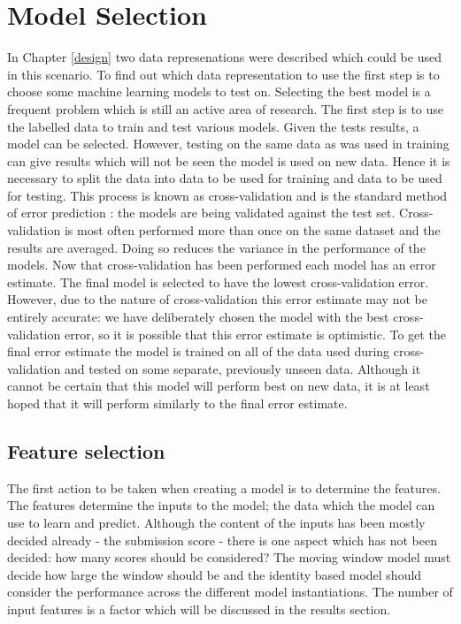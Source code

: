 \chapter{Model Selection}
\label{machinelearning}
In Chapter \ref{design} two data represenations were described which could be used in this scenario. To find out which data representation to use the first step is to choose some machine learning models to test on. Selecting the best model is a frequent problem which is still an active area of research. The first step is to use the labelled data to train and test various models. Given the tests results, a model can be selected. However, testing on the same data as was used in training can give results which will not be seen the model is used on new data. Hence it is necessary to split the data into data to be used for training and data to be used for testing. This process is known as cross-validation and is the standard method of error prediction \cite{witten2011data}: the models are being validated against the test set. Cross-validation is most often performed more than once on the same dataset and the results are averaged. Doing so reduces the variance in the performance of the models.
Now that cross-validation has been performed each model has an error estimate. The final model is selected to have the lowest cross-validation error. However, due to the nature of cross-validation this error estimate may not be entirely accurate: we have deliberately chosen the model with the best cross-validation error, so it is possible that this error estimate is optimistic. To get the final error estimate the model is trained on all of the data used during cross-validation and tested on some separate, previously unseen data.
Although it cannot be certain that this model will perform best on new data, it is at least hoped that it will perform similarly to the final error estimate.

\section{Feature selection}
The first action to be taken when creating a model is to determine the features. The features determine the inputs to the model; the data which the model can use to learn and predict. Although the content of the inputs has been mostly decided already - the submission score - there is one aspect which has not been decided: how many scores should be considered? The moving window model must decide how large the window should be and the identity based model should consider the performance across the different model instantiations. The number of input features is a factor which will be discussed in the results section.


